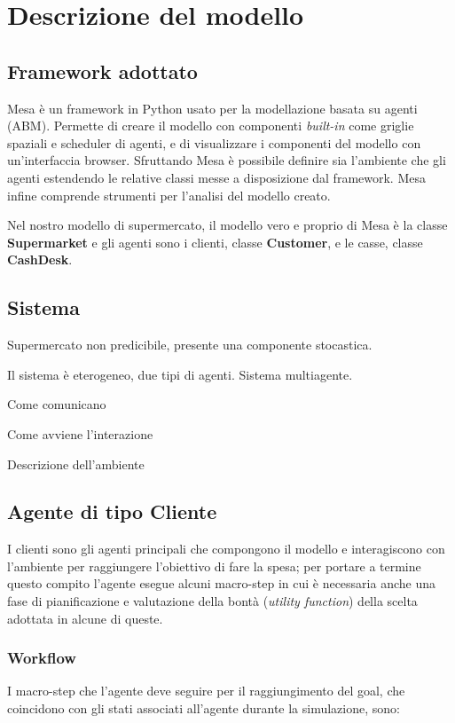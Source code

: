 \chapter{Descrizione del modello}

\section{Framework adottato}

 Mesa è un framework in Python usato per la modellazione basata su agenti (ABM). Permette di creare il modello con componenti \textit{built-in} come griglie spaziali e scheduler di agenti, e di visualizzare i componenti del modello con un'interfaccia browser. Sfruttando Mesa è possibile definire sia l'ambiente che gli agenti estendendo le relative classi messe a disposizione dal framework. Mesa infine comprende strumenti per l'analisi del modello creato.

Nel nostro modello di supermercato, il modello vero e proprio di Mesa è la classe \textbf{Supermarket} e gli agenti sono i clienti, classe \textbf{Customer}, e le casse, classe \textbf{CashDesk}. 

\section{Sistema}
Supermercato non predicibile, presente una componente stocastica.

Il sistema è eterogeneo, due tipi di agenti. Sistema multiagente.

Come comunicano

Come avviene l'interazione

Descrizione dell'ambiente

\section{Agente di tipo Cliente}
I clienti sono gli agenti principali che compongono il modello e interagiscono con l'ambiente per raggiungere l'obiettivo di fare la spesa; per portare a termine questo compito l'agente esegue alcuni macro-step in cui è necessaria anche una fase di pianificazione e valutazione della bontà (\textit{utility function}) della scelta adottata in alcune di queste.

\subsection{Workflow}
I macro-step che l'agente deve seguire per il raggiungimento del goal, che coincidono con gli stati associati all'agente durante la simulazione, sono:

